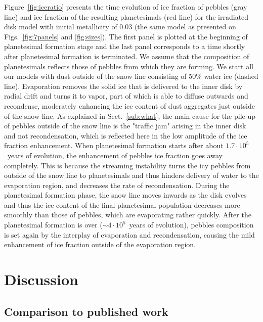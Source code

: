 \documentclass{aa}
\begin{document}
Figure~\ref{fig:iceratio} presents the time evolution of ice fraction of pebbles (gray line) and ice fraction of the resulting planetesimals (red line) for the irradiated disk model with initial metallicity of 0.03 (the same model as presented on Figs.~\ref{fig:7panels} and \ref{fig:sizes}). The first panel is plotted at the beginning of planetesimal formation stage and the last panel corresponds to a time shortly after planetesimal formation is terminated. We assume that the composition of planetesimals reflects those of pebbles from which they are forming.
We start all our models with dust outside of the snow line consisting of 50\% water ice (dashed line). Evaporation removes the solid ice that is delivered to the inner disk by radial drift and turns it to vapor, part of which is able to diffuse outwards and recondense, moderately enhancing the ice content of dust aggregates just outside of the snow line. As explained in Sect.~\ref{sub:what}, the main cause for the pile-up of pebbles outside of the snow line is the "traffic jam" arising in the inner disk and not recondensation, which is reflected here in the low amplitude of the ice fraction enhancement. When planetesimal formation starts after about $1.7\cdot10^5$~years of evolution, the enhancement of pebbles ice fraction goes away completely. This is because the streaming instability turns the icy pebbles from outside of the snow line to planetesimals and thus hinders delivery of water to the evaporation region, and decreases the rate of recondensation. During the planetesimal formation phase, the snow line moves inwards as the disk evolves and thus the ice content of the final planetesimal population decreases more smoothly than those of pebbles, which are evaporating rather quickly. After the planetesimal formation is over ($\sim4\cdot10^5$~years of evolution), pebbles composition is set again by the interplay of evaporation and recondensation, causing the mild enhancement of ice fraction outside of the evaporation region.

\section{Discussion}\label{sub:discussion}

\subsection{Comparison to published work}
\end{document}

